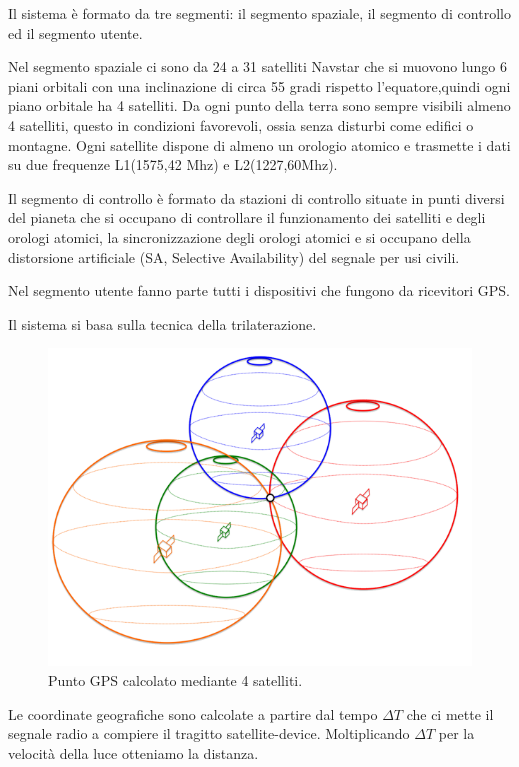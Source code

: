 \documentclass[12pt,a4paper,openright,twoside]{report}
\begin{document}
Il sistema è formato da tre segmenti: il segmento spaziale, il segmento di controllo ed il segmento utente. \cite{K15}


Nel segmento spaziale ci sono da 24 a 31 satelliti Navstar che si muovono lungo 6 piani orbitali con una inclinazione di circa 55 gradi rispetto l'equatore,quindi ogni piano orbitale ha 4 satelliti. Da ogni punto della terra sono sempre visibili almeno 4 satelliti, questo in condizioni favorevoli, ossia senza disturbi come edifici o montagne. Ogni satellite dispone di almeno un orologio atomico e trasmette i dati su due frequenze L1(1575,42 Mhz) e L2(1227,60Mhz).


Il segmento di controllo è formato da stazioni di controllo situate in punti diversi del pianeta che si occupano di controllare il funzionamento dei satelliti e degli orologi atomici, la sincronizzazione degli orologi atomici e si occupano della distorsione artificiale (SA, Selective Availability) del segnale per usi civili.


Nel segmento utente fanno parte tutti i dispositivi che fungono da ricevitori GPS.


Il sistema si basa sulla tecnica della trilaterazione. 

\begin{figure}[h!]
\centering 
\includegraphics[scale=0.6]{fig8} 
\caption{Punto GPS calcolato mediante 4 satelliti. \cite{K16}} 
\end{figure}
Le coordinate geografiche sono calcolate a partire dal tempo $ \Delta T $ che ci mette il segnale radio a compiere il tragitto satellite-device. Moltiplicando $ \Delta T $ per la velocità della luce otteniamo la distanza. 
\end{document}
